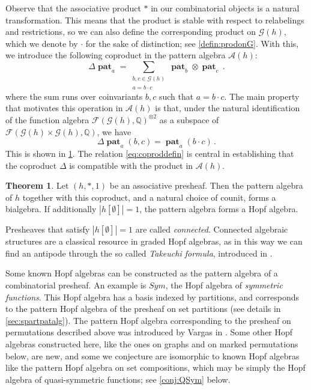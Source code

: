 \documentclass[12pt, reqno]{amsart}
\theoremstyle{definition}
\newtheorem{thm}{Theorem}[section]
\DeclareMathOperator{\pat}{\mathbf{pat}}
\begin{document}
Observe that the associative product $\ast $ in our combinatorial objects is a natural transformation.
This means that the product is stable with respect to relabelings and restrictions, so we can also define the corresponding product on $\mathcal{G}(h)$, which we denote by $\cdot $ for the sake of distinction; see \cref{defin:prodonG}.
With this, we introduce the following coproduct in the pattern algebra $\mathcal A (h)$:
\begin{equation}\label{eq:coprodformula}
\Delta \pat_ a = \sum_{\substack{ b, c\in \mathcal G (h) \\ a = b \cdot c}} \pat_b \otimes \pat_c \, .
\end{equation}
where the sum runs over coinvariants $b, c$ such that $a = b \cdot c$.
The main property that motivates this operation in $\mathcal{A}(h)$ is that, under the natural identification of the function algebra $\mathcal{F}(\mathcal G (h), \mathbb Q)^{\otimes 2} $ as a subspace of $\mathcal{F}(\mathcal G (h) \times \mathcal G (h), \mathbb Q) $, we have
\begin{equation}\label{eq:coproddefin}
 \Delta \pat_a (b,  c) =  \pat_a (b \cdot c) \, .
\end{equation}
This is shown in \cref{thm:conHopfalgebra}.
The relation \eqref{eq:coproddefin} is central in establishing that the coproduct $\Delta $ is compatible with the product in $\mathcal A (h)$.


\begin{thm}\label{thm:conHopfalgebra}
Let $(h, \ast, 1) $ be an associative presheaf.
Then the pattern algebra of $h$ together with this coproduct, and a natural choice of counit, forms a bialgebra.
If additionally $| h[\emptyset ] | = 1 $, the pattern algebra forms a Hopf algebra.
\end{thm}

Presheaves that satisfy $|h[\emptyset ]| = 1$ are called \textit{connected}.
Connected algebraic structures are a classical resource in graded Hopf algebras, as in this way we can find an antipode through the so called \textit{Takeuchi formula}, introduced in \cite{takeuchi71}.

Some known Hopf algebras can be constructed as the pattern algebra of a combinatorial presheaf.
An example is $Sym$, the Hopf algebra of \textit{symmetric functions}.
This Hopf algebra has a basis indexed by partitions, and corresponds to the pattern Hopf algebra of the presheaf on set partitions (see details in \cref{sec:spartpatalg}).
The pattern Hopf algebra corresponding to the presheaf on permutations described above was introduced by Vargas in \cite{vargas14}.
Some other Hopf algebras constructed here, like the ones on graphs and on marked permutations below, are new, and some we conjecture are isomorphic to known Hopf algebras like the pattern Hopf algebra on set compositions, which may be simply the Hopf algebra of quasi-symmetric functions; see \cref{conj:QSym} below.
\end{document}
